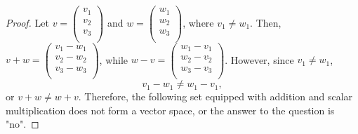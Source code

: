 \renewcommand*{\proofname}{Solution}
\begin{proof}
    Let $v=\left( \begin{array}{c}v_1 \\v_2 \\v_3 \\ \end{array}  \right)$ and $w=\left( \begin{array}{c}w_1 \\w_2 \\w_3 \\ \end{array}  \right)$, where $v_1\not=w_1$.
    Then, $v+w=\left( \begin{array}{c}v_1-w_1 \\v_2-w_2 \\v_3-w_3 \\ \end{array}  \right)$, while $w-v=\left( \begin{array}{c}w_1-v_1 \\w_2-v_2 \\w_3-v_3 \\ \end{array}  \right)$. However, since $v_1\not=w_1$,
    \[
        v_1-w_1\not=w_1-v_1,  
    \] 
    or $v+w\not=w+v$. Therefore, the following set equipped with addition and scalar multiplication does not form a vector space, or the answer to the question is "no".
\end{proof}